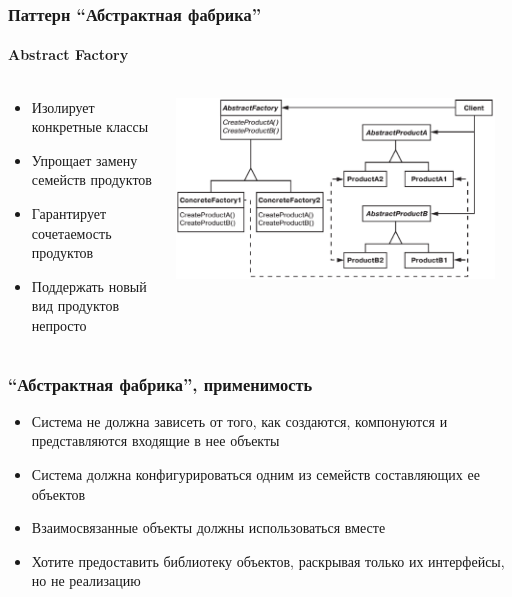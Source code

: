 \documentclass[xetex,mathserif,serif]{beamer}
\begin{document}
    \begin{frame}
        \frametitle{Паттерн ``Абстрактная фабрика''}
        \framesubtitle{Abstract Factory}
        \begin{columns}
            \begin{column}{0.4\textwidth}
                \begin{itemize}
                    \item Изолирует конкретные классы
                    \item Упрощает замену семейств продуктов
                    \item Гарантирует сочетаемость продуктов
                    \item Поддержать новый вид продуктов непросто
                \end{itemize}
            \end{column}
            \begin{column}{0.6\textwidth}
                \begin{center}
                    \includegraphics[width=0.95\textwidth]{abstractFactory.png}
                \end{center}
            \end{column}
        \end{columns}
    \end{frame}

    \begin{frame}
        \frametitle{``Абстрактная фабрика'', применимость}
        \begin{itemize}
            \item Система не должна зависеть от того, как создаются, компонуются и представляются входящие в нее объекты
            \item Система должна конфигурироваться одним из семейств составляющих ее объектов
            \item Взаимосвязанные объекты должны использоваться вместе
            \item Хотите предоставить библиотеку объектов, раскрывая только их интерфейсы, но не реализацию
        \end{itemize}
    \end{frame}
\end{document}
